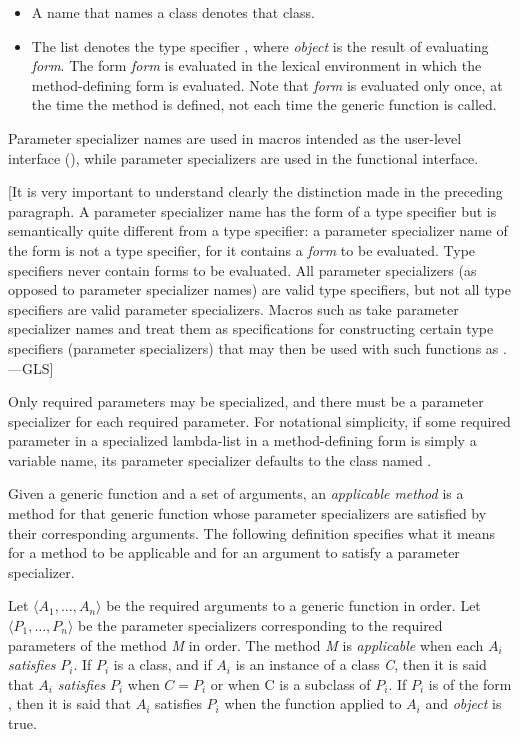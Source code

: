 \begin{itemize}
\item  A name that names a class denotes that class.

\item  The list  denotes the type specifier
, where \emph{object\/} is the result of
evaluating \emph{form\/}.  The form \emph{form\/} is evaluated in the
lexical environment in which the method-defining form is
evaluated.  Note that \emph{form\/} is evaluated only once, at the time
the method is defined, not each time the generic function is called.
\end{itemize}

Parameter specializer names are used in macros intended as the
user-level interface (), while parameter specializers
are used in the functional interface.

[It is very important to understand clearly the distinction made
in the preceding paragraph.  A parameter specializer name
has the form of a type specifier but is semantically quite different
from a type specifier: a parameter specializer name of the form
 is not a type specifier, for it contains
a \emph{form\/} to be evaluated.   Type specifiers
never contain forms to be evaluated.  All parameter specializers
(as opposed to parameter specializer names) are valid type specifiers,
but not all type specifiers are valid parameter specializers.  Macros such as 
take parameter specializer names and treat them as specifications for
constructing certain type specifiers (parameter specializers) that may then be used
with such functions as .---GLS]


Only required parameters may be specialized, and there must be a
parameter specializer for each required parameter.  For notational
simplicity, if some required parameter in a specialized lambda-list in
a method-defining form is simply a variable name, its parameter
specializer defaults to the class named .

Given a generic function and a set of arguments, an \emph{applicable
method\/} is a method for that generic function whose parameter
specializers are satisfied by their corresponding arguments.  The
following definition specifies what it means for a method to be
applicable and for an argument to satisfy a parameter specializer.

Let $\langle A_1, \ldots, A_{n}\rangle$ be the required
arguments to a generic function in order. Let $\langle P_1,
\ldots, P_{n}\rangle$ be the parameter specializers corresponding to
the required parameters of the method \emph{M} in order.  The method \emph{M} is
\emph{applicable\/} when each $A_{i}$
\emph{satisfies\/} $P_{i}$.
If $P_{i}$ is a class,
and if $A_{i}$ is an instance of a class
\emph{C}, then it is said that $A_{i}$ \emph{satisfies\/}
$P_{i}$ when $C=P_{i}$ or when C is a subclass of $P_{i}$.  If
$P_{i}$ is of the form
, then it is said that
$A_{i}$ satisfies $P_{i}$
when the function  applied to
$A_{i}$ and \emph{object} is true.

